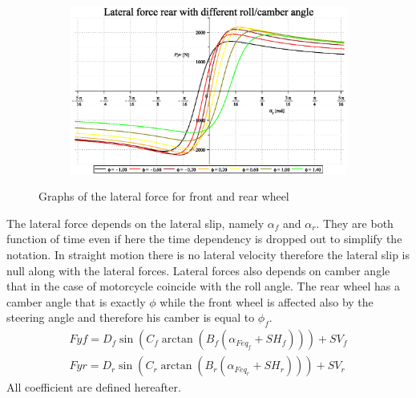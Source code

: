 \begin{figure}[hbt!]
\begin{subfigure}{.5\textwidth}
        \caption{}
        \label{fig:lat1c}
    \end{subfigure}%
    \begin{subfigure}{.5\textwidth}
        \includegraphics[width=\linewidth]{MotoModel_tex/MotoModelplot2d6.eps}
        \caption{}
        \label{fig:lat1d}
    \end{subfigure}
    \caption{Graphs of the lateral force for front and rear wheel}
\end{figure}
%
%
The lateral force depends on the lateral slip, namely $\alpha_f$ and $\alpha_r$. They are both function of time even if here the time dependency is dropped out to simplify the notation. In straight motion there is no lateral velocity therefore the lateral slip is null along with the lateral forces. Lateral forces also depends on camber angle that in the case of motorcycle coincide with the roll angle. The rear wheel has a camber angle that is exactly $\phi$ while the front wheel is affected also by the steering angle and therefore his camber is equal to $\phi_f$. 
%
\begin{equation}
    \begin{array}{l}
        Fyf = D_f \sin(C_f \arctan(B_f ( \alpha_{Feq_f} + SH_f))) + SV_f\\
        Fyr = D_r \sin(C_r \arctan(B_r ( \alpha_{Feq_r} + SH_r))) + SV_r
    \end{array}
\end{equation}
%
All coefficient are defined hereafter.
%
